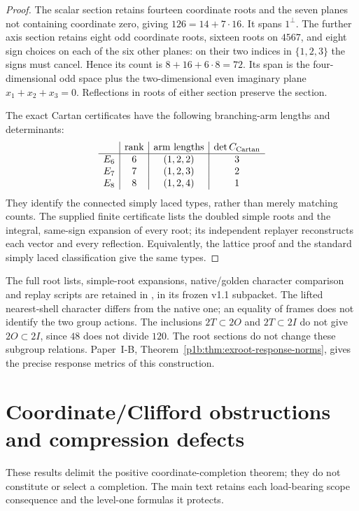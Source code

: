 \documentclass[11pt]{article}
\begin{document}
\begin{proof}
The scalar section retains fourteen coordinate roots and the seven
planes not containing coordinate zero, giving
\(126=14+7\cdot16\). It spans \(1^\perp\). The further axis section
retains eight odd coordinate roots, sixteen roots on \(4567\), and
eight sign choices on each of the six other planes: on their two
indices in \(\{1,2,3\}\) the signs must cancel. Hence its count is
\(8+16+6\cdot8=72\). Its span is the four-dimensional odd space plus
the two-dimensional even imaginary plane \(x_1+x_2+x_3=0\).
Reflections in roots of either section preserve the section.

The exact Cartan certificates have the following branching-arm lengths
and determinants:
\[
\begin{array}{c|c|c|c}
 &\text{rank}&\text{arm lengths}&\det C_{\rm Cartan}\\ \hline
 E_6&6&(1,2,2)&3\\
 E_7&7&(1,2,3)&2\\
 E_8&8&(1,2,4)&1
\end{array}
\]
They identify the connected simply laced types, rather than merely
matching counts. The supplied finite certificate lists the doubled
simple roots and the integral, same-sign expansion of every root;
its independent replayer reconstructs each vector and every reflection.
Equivalently, the lattice proof and the standard simply laced
classification give the same types.
\end{proof}

\begin{remark}
\label{p1:rem:exroot-construction-scope}
The full root lists, simple-root expansions, native/golden character
comparison and replay scripts are retained in
, in its frozen v1.1
subpacket. The lifted nearest-shell character differs from the native
one; an equality of frames does not identify the two group actions.
The inclusions \(2T\subset2O\) and \(2T\subset2I\) do not give
\(2O\subset2I\), since \(48\) does not divide \(120\).
The root sections do not change these subgroup relations. Paper~I-B,
Theorem~\ref{p1b:thm:exroot-response-norms}, gives the precise response
metrics of this construction.
\end{remark}




\section{Coordinate/Clifford obstructions and compression defects}
\label{p1:app:coordinate-clifford-obstructions}
These results delimit the positive coordinate-completion theorem; they do not
constitute or select a completion.  The main text retains each load-bearing
scope consequence and the level-one formulas it protects.
\end{document}
